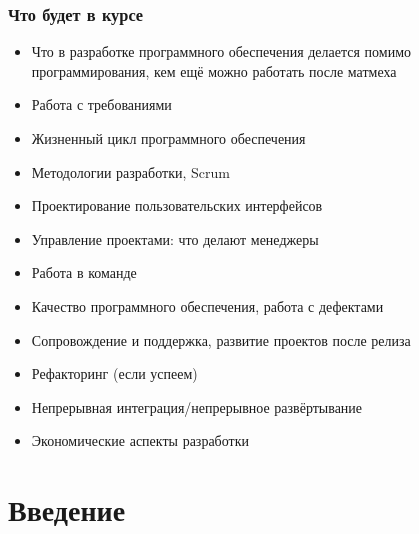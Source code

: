 \documentclass{../../slides-style}
\begin{document}
    \begin{frame}
        \frametitle{Что будет в курсе}
        \begin{itemize}
            \item Что в разработке программного обеспечения делается помимо программирования, кем ещё можно работать после матмеха
            \item Работа с требованиями
            \item Жизненный цикл программного обеспечения
            \item Методологии разработки, Scrum
            \item Проектирование пользовательских интерфейсов
            \item Управление проектами: что делают менеджеры
            \item Работа в команде
            \item Качество программного обеспечения, работа с дефектами
            \item Сопровождение и поддержка, развитие проектов после релиза
            \item Рефакторинг (если успеем)
            \item Непрерывная интеграция/непрерывное развёртывание
            \item Экономические аспекты разработки
        \end{itemize}
    \end{frame}

    \section{Введение}
\end{document}
